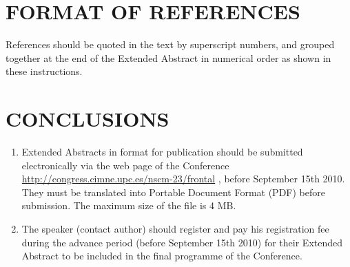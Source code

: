 \documentclass{nordic}
\newcommand{\NSCM}{23}
\newcommand{\submissiondate}{September 15th 2010}
\newcommand{\submissionpage}{http://congress.cimne.upc.es/nscm-\NSCM/frontal}
\begin{document}
\section{FORMAT OF REFERENCES}

References should be quoted in the text by superscript numbers\cite{Zienkiewicz,Idelsohn}, and  grouped together at the end of
the Extended Abstract in numerical order as shown in these instructions.

\section{CONCLUSIONS}

\begin{enumerate}
\item Extended Abstracts in format for publication should be submitted electronically via the web page of the
Conference \url{\submissionpage} , before \submissiondate.
They must be translated into Portable Document Format (PDF) before submission.
The maximum size of the file is 4 MB.

\item The speaker (contact author) should register and pay his registration fee during the advance period
(before \submissiondate) for their Extended Abstract
to be included in the final programme of the Conference.
\end{enumerate}




\end{document}
